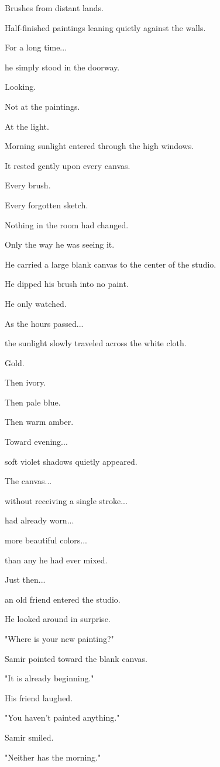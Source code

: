 \documentclass[12pt,openany]{book}
\begin{document}
Brushes from distant lands.

Half-finished paintings leaning quietly against the walls.

For a long time...

he simply stood in the doorway.

Looking.

Not at the paintings.

At the light.

Morning sunlight entered through the high windows.

It rested gently upon every canvas.

Every brush.

Every forgotten sketch.

Nothing in the room had changed.

Only the way he was seeing it.

He carried a large blank canvas to the center of the studio.

He dipped his brush into no paint.

He only watched.

As the hours passed...

the sunlight slowly traveled across the white cloth.

Gold.

Then ivory.

Then pale blue.

Then warm amber.

Toward evening...

soft violet shadows quietly appeared.

The canvas...

without receiving a single stroke...

had already worn...

more beautiful colors...

than any he had ever mixed.

Just then...

an old friend entered the studio.

He looked around in surprise.

"Where is your new painting?"

Samir pointed toward the blank canvas.

"It is already beginning."

His friend laughed.

"You haven't painted anything."

Samir smiled.

"Neither has the morning."
\end{document}
